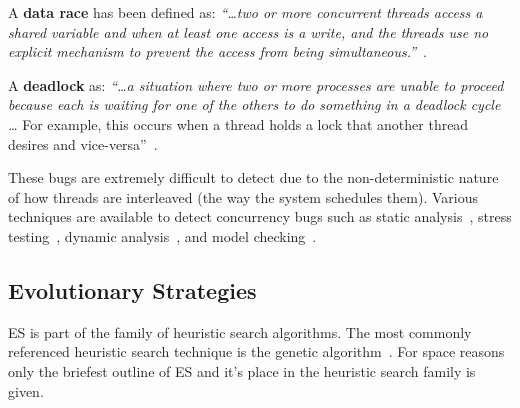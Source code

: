 \documentclass{llncs}
\begin{document}

A \textbf{data race} has been defined as: \textit{``\ldots two or more
concurrent threads access a shared variable and when at least one access is a
write, and the threads use no explicit mechanism to prevent the access from
being simultaneous.''}~\cite{LSW07}.

A \textbf{deadlock} as: \textit{``\ldots a situation where two or more
processes are unable to proceed because each is waiting for one of the others
to do something in a deadlock cycle \ldots} For example, this occurs when a
thread holds a lock that another thread desires and vice-versa''~\cite{LSW07}.

These bugs are extremely difficult to detect due to the non-deterministic
nature of how threads are interleaved (the way the system schedules them).
Various techniques are available to detect concurrency bugs such as
static analysis~\cite{NA07,NPSG09,HP04}, stress testing~\cite{HSU03}, dynamic
analysis~\cite{JNPS09,EFN+02}, and model
checking~\cite{BHPV00,RDH03,OM03,MQB07,Holz97,JM04,HP00}.

\subsection{Evolutionary Strategies}
\label{sec:evolutionary_strategies}

ES is part of the family of heuristic search algorithms. The most commonly
referenced heuristic search technique is the genetic algorithm~\cite{GA92}. For
space reasons only the briefest outline of ES and it's place in the heuristic
search family is given.

\end{document}
